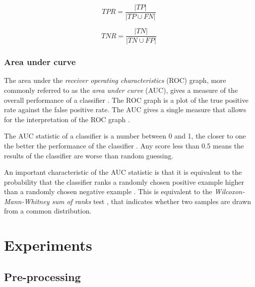 \documentclass{article}[paper=a4,pagesize=auto,10pt]
\begin{document}
\begin{equation}
\label{eq:sensitivity}
TPR = \frac{|TP|}{|TP \cup FN|}
\end{equation}

\begin{equation}
\label{eq:specitivity}
TNR = \frac{|TN|}{|TN \cup FP|}
\end{equation}

\subsubsection{Area under curve} \label{Area under curve (AUC)}

The area under the \textit{receiver operating characteristics} (ROC) graph, more commonly referred to as the \textit{area under curve} (AUC), gives a measure of the overall performance of a classifier \cite{james2013introduction}. The ROC graph is a plot of the true positive rate against the false positive rate. The AUC gives a single measure that allows for the interpretation of the ROC graph \cite{fawcett2006introduction}. \medskip

The AUC statistic of a classifier is a number between 0 and 1, the closer to one the better the performance of the classifier \cite{fawcett2006introduction,james2013introduction}. Any score less than 0.5 means the results of the classifier are worse than random guessing. \medskip

An important characteristic of the AUC statistic is that it is equivalent to the probability that the classifier ranks a randomly chosen positive example higher than a randomly chosen negative example \cite{fawcett2006introduction}.  This is equivalent to the \textit{Wilcoxon-Mann-Whitney sum of ranks} test \cite{sammut2017encyclopedia}, that indicates whether two samples are drawn from a common distribution.



\section{Experiments}
\label{Experiments}

\subsection{Pre-processing} \label{Pre-processing}
\end{document}
